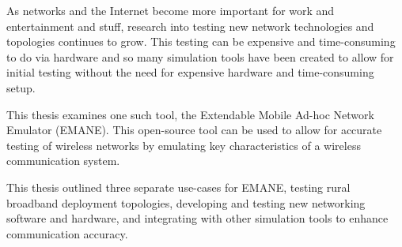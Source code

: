 As networks and the Internet become more important for work and entertainment and stuff, research into testing new network technologies and topologies continues to grow. %
This testing can be expensive and time-consuming to do via hardware and so many simulation tools have been created to allow for initial testing without the need for expensive hardware and time-consuming setup.

This thesis examines one such tool, the Extendable Mobile Ad-hoc Network Emulator (EMANE).
This open-source tool can be used to allow for accurate testing of wireless networks by emulating key characteristics of a wireless communication system.

This thesis outlined three separate use-cases for EMANE, testing rural broadband deployment topologies, developing and testing new networking software and hardware, and integrating with other simulation tools to enhance communication accuracy.
